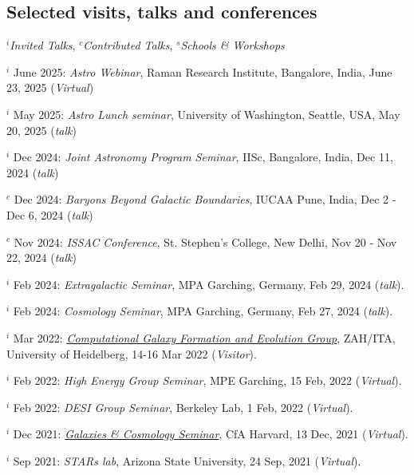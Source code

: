 \documentclass[12pt,letterpaper]{article}
\begin{document}
\subsection{Selected visits, talks and conferences}
\vspace{-1mm}
$^i$\emph{Invited Talks}, $^c$\emph{Contributed Talks}, $^s$\emph{Schools \& Workshops}
\begin{list}{}{\cvlist}
\item $^i$ June 2025:  \emph{Astro Webinar}, Raman Research Institute, Bangalore, India, June 23, 2025 (\textit{Virtual})
\item $^i$ May 2025:  \emph{Astro Lunch seminar}, University of Washington, Seattle, USA, May 20, 2025 (\textit{talk})
\item $^i$ Dec 2024:  \emph{Joint Astronomy Program Seminar}, IISc, Bangalore, India, Dec 11, 2024 (\textit{talk})
\item $^c$ Dec 2024:  \emph{Baryons Beyond Galactic Boundaries}, IUCAA Pune, India, Dec 2 - Dec 6, 2024 (\textit{talk})
\item $^c$ Nov 2024:  \emph{ISSAC Conference}, St. Stephen's College, New Delhi, Nov 20 - Nov 22, 2024 (\textit{talk})
\item $^i$ Feb 2024:  \emph{Extragalactic Seminar}, MPA Garching, Germany, Feb 29, 2024 (\textit{talk}).
\item $^i$ Feb 2024:  \emph{Cosmology Seminar}, MPA Garching, Germany, Feb 27, 2024 (\textit{talk}).
\item $^i$ Mar 2022:  \emph{\href{https://zah.uni-heidelberg.de/research-groups\#c2659}{Computational Galaxy Formation and Evolution Group}}, ZAH/ITA, University of Heidelberg, 14-16 Mar 2022 (\textit{Visitor}).
\item $^i$ Feb 2022:  \emph{High Energy Group Seminar}, MPE Garching, 15 Feb, 2022 (\textit{Virtual}).
\item $^i$ Feb 2022:  \emph{DESI Group Seminar}, Berkeley Lab, 1 Feb, 2022 (\textit{Virtual}).
\item $^i$ Dec 2021:  \emph{\href{https://pweb.cfa.harvard.edu/calendar/event/9298}{Galaxies \& Cosmology Seminar}}, CfA Harvard, 13 Dec, 2021 (\textit{Virtual}).
\item $^i$ Sep 2021:  \textit{STARs lab}, Arizona State University, 24 Sep, 2021 (\textit{Virtual}).
\end{list}
\vspace{-1.5mm}
\end{document}
